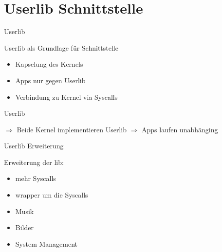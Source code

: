 \section{Userlib Schnittstelle}



\begin{frame}{Userlib}
    \begin{Large}
        Userlib als Grundlage für Schnittstelle
    \end{Large}
    \vspace{15pt}

    \begin{itemize}
        \item Kapselung des Kernels
        \item Apps nur gegen Userlib
        \item Verbindung zu Kernel via Syscalls
    \end{itemize}
    
\end{frame}


\begin{frame}{Userlib}
    \begin{Large}
        $\Rightarrow$ Beide Kernel implementieren Userlib \newline \newline
        $\Rightarrow$ Apps laufen unabhänging
    \end{Large}
    \vspace{15pt}
\end{frame}


\begin{frame}{Userlib Erweiterung}
    \begin{Large}
        Erweiterung der lib: \cite{usrlib-repo}
    \end{Large}
    \vspace{15pt}

    \begin{itemize}
        \item mehr Syscalls
        \item wrapper um die Syscalls
        \item Musik
        \item Bilder
        \item System Management
    \end{itemize}
\end{frame}


